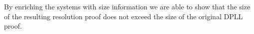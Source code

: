 
By enriching the systems with size information we are able to 
show that the size of the resulting resolution proof does not exceed
the size of the original DPLL proof.


